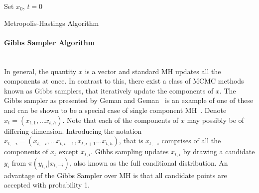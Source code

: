 	\begin{algorithm}[H]
	\label{alg:MetHast}
 Set $x_0$, $t=0$\; 


 \caption{Metropolis-Hastings Algorithm}
\end{algorithm}

	\paragraph{Gibbs Sampler Algorithm}\label{ssSec:GS}~\\
\noindent
In general, the quantity $x$ is a vector and standard MH updates all the components at once. In contrast to this, there exist a class of MCMC methods known as Gibbs samplers, that iteratively update the components of $x$. The Gibbs sampler as presented by Geman and Geman~\cite{geman1984stochastic} is an example of one of these and can be shown to be a special case of single component MH~\cite{gilks1995markov}. 
Denote $x_t = (x_{t,1},\ldots x_{t,h})$. Note that each of the components of $x$ may possibly be of differing dimension. 
Introducing the notation $x_{t,-i} = (x_{t,-i},\ldots x_{t,i-1}, x_{t,i+1} \ldots x_{t,h})$, that is $x_{t,-i}$ comprises of all the components of $x_t$ except $x_{t,i}$. Gibbs sampling updates $x_{t,i}$ by drawing a candidate $y_i$ from $\pi(y_{t,i}|x_{t,-i})$, also known as the full conditional distribution. An advantage of the Gibbs Sampler over MH is that all candidate points are accepted with probability 1.

